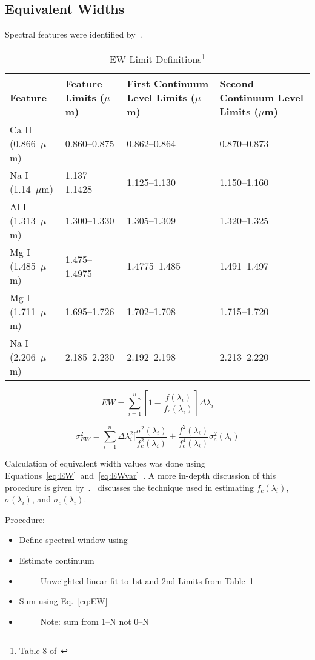 \subsection{Equivalent Widths}


Spectral features were identified by~\cite{Rayner_2009}.  

\begin{table}[H]
    \caption{EW Limit Definitions\footnote{Table 8 of~\cite{Rayner_2009}}}
	\begin{tabular}{l|l|l|l}
	\label{tab:features}
		Feature & Feature Limits ($\mu$m) & First Continuum Level Limits ($\mu$m) & Second Continuum Level Limits ($\mu$m) \\ \hline
		Ca II (0.866~$\mu$m) & 0.860--0.875 & 0.862--0.864 & 0.870--0.873 \\
		Na I (1.14~$\mu$m) & 1.137--1.1428 & 1.125--1.130 & 1.150--1.160 \\
		Al I (1.313~$\mu$m) & 1.300--1.330 & 1.305--1.309 & 1.320--1.325 \\
		Mg I (1.485~$\mu$m) & 1.475--1.4975 & 1.4775--1.485 & 1.491--1.497 \\
		Mg I (1.711~$\mu$m) & 1.695--1.726 & 1.702--1.708 & 1.715--1.720 \\
		Na I (2.206~$\mu$m) & 2.185--2.230 & 2.192--2.198 & 2.213--2.220 \\
	\end{tabular}
\end{table}

\begin{equation}\label{eq:EW}
	EW = \sum_{i=1}^{n} [1 - \frac{f(\lambda_{i})}{f_{c}(\lambda_{i})}] \Delta\lambda_{i}
\end{equation}

\begin{equation}\label{eq:EWvar}
	\sigma_{EW}^{2} = \sum_{i=1}^{n} \Delta\lambda_{i}^{2} [\frac{\sigma^{2}(\lambda_{i})}{f_{c}^{2}(\lambda_{i})} + \frac{f^{2}(\lambda_{i})}{f_{c}^{4}(\lambda_{i})}\sigma_{c}^{2}(\lambda_{i})
\end{equation}


Calculation of equivalent width values was done using Equations~\ref{eq:EW}~and~\ref{eq:EWvar}~\cite{Cushing_2005}.  A more in-depth discussion of this procedure is given by~\cite{Cushing_2005}.  \cite{Sembach_1992}~discusses the technique used in estimating $f_{c}(\lambda_{i})$, $\sigma(\lambda_{i})$, and $\sigma_{c}(\lambda_{i})$.

Procedure:\\
\begin{itemize}
	\item{} Define spectral window using
	\item{} Estimate continuum
	\item{}~~~~~Unweighted linear fit to 1st and 2nd Limits from Table~\ref{tab:features}
	\item{} Sum using Eq.~\ref{eq:EW}
	\item{}~~~~~Note: sum from 1--N not 0--N
\end{itemize}



